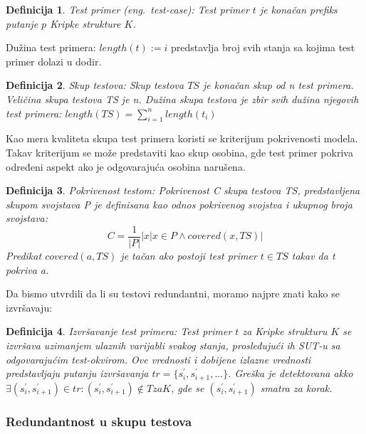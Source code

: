 \documentclass[a4paper]{article}
\newtheorem{definition}{Definicija}[section]
\begin{document}
\begin{definition}{Test primer (eng.~{\textit test-case}):}
Test primer $t$ je konačan prefiks putanje $p$ Kripke strukture $K$.
\end{definition}

Dužina test primera: $ length(t) := i$ predstavlja broj svih stanja sa kojima test primer dolazi u dodir.

\begin{definition}{Skup testova:}
Skup testova $TS$ je konačan skup od n test primera. Veličina skupa testova TS je n. Dužina skupa testova je zbir svih dužina njegovih test primera: $
    length(TS) = \sum_{i=1}^{n}length(t_i)$
\end{definition}

Kao mera kvaliteta skupa test primera koristi se kriterijum pokrivenosti modela. Takav kriterijum se može predstaviti kao skup osobina, gde test primer pokriva određeni aspekt ako je odgovarajuća osobina narušena.

\begin{definition}{Pokrivenost testom:}
Pokrivenost C skupa testova TS, predstavljena skupom svojstava P je definisana kao odnos pokrivenog svojstva i ukupnog broja svojstava:
\begin{equation}
    C = \frac{1}{|P|}|{x|x \in P \land covered(x,TS)}|
\end{equation}
Predikat $ covered(a, TS)$ je tačan ako postoji test primer $ t \in TS$ takav da \textit{t} pokriva \textit{a}.
\end{definition}

Da bismo utvrdili da li su testovi redundantni, moramo najpre znati kako se izvršavaju:

\begin{definition}{Izvršavanje test primera:}
Test primer $t$ za Kripke strukturu $K$ se izvršava uzimanjem ulaznih varijabli svakog stanja, prosleđujući ih SUT-u sa odgovarajućim test-okvirom. Ove vrednosti i dobijene izlazne vrednosti predstavljaju putanju izvršavanja $ tr = \{s_{i}^{'}, s_{i+1}^{'}, ...\} $. Greška je detektovana akko $ \exists (s_{i}^{'}, s_{i+1}^{'}) \in tr : (s_{i}^{'}, s_{i+1}^{'}) \notin T za K $, gde se $ (s_{i}^{'}, s_{i+1}^{'})$ smatra za korak.
\end{definition}

\subsubsection{Redundantnost u skupu testova}
\label{subsubsec:redundantnost}
\end{document}

